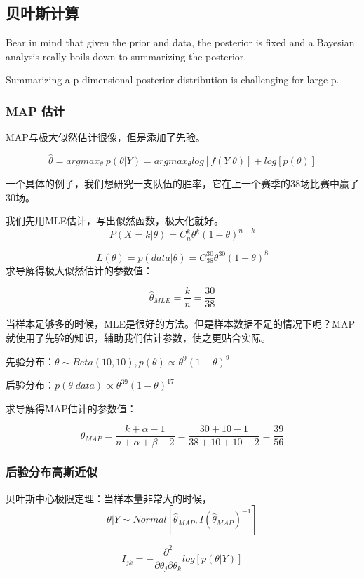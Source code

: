 \documentclass[
]{book}
\begin{document}
\subsection{贝叶斯计算}\label{ux8d1dux53f6ux65afux8ba1ux7b97-1}

Bear in mind that given the prior and data, the posterior is fixed and a Bayesian analysis really boils down to summarizing the posterior.

Summarizing a p-dimensional posterior distribution is challenging for large p.

\subsubsection{MAP 估计}\label{map-ux4f30ux8ba1}

MAP与极大似然估计很像，但是添加了先验。

\[
\hat{\theta}=argmax_{\theta}\ p(\theta|Y) = argmax_{\theta} log[f(Y|\theta)]+log[p(\theta)]
\]

一个具体的例子，我们想研究一支队伍的胜率，它在上一个赛季的38场比赛中赢了30场。

我们先用MLE估计，写出似然函数，极大化就好。 \[
P(X=k|\theta)=C_n^k\theta^k(1-\theta)^{n-k}
\]

\[
L(\theta)=p(data|\theta) = C_{38}^{30}\theta^{30}(1-\theta)^8
\] 求导解得极大似然估计的参数值：

\[
\hat{\theta}_{MLE}=\frac{k}{n}=\frac{30}{38}
\]

当样本足够多的时候，MLE是很好的方法。但是样本数据不足的情况下呢？MAP就使用了先验的知识，辅助我们估计参数，使之更贴合实际。

先验分布：\(\theta\sim Beta(10,10),p(\theta)\propto \theta^9(1-\theta)^9\)

后验分布：\(p(\theta|data)\propto \theta^{39}(1-\theta)^{17}\)

求导解得MAP估计的参数值：

\[
\hat{\theta}_{MAP}=\frac{k+\alpha-1}{n+\alpha+\beta-2}=\frac{30+10-1}{38+10+10-2}=\frac{39}{56}
\]

\subsubsection{后验分布高斯近似}\label{ux540eux9a8cux5206ux5e03ux9ad8ux65afux8fd1ux4f3c}

贝叶斯中心极限定理：当样本量非常大的时候， \[
\theta|Y\sim Normal[\hat{\theta}_{MAP},I(\hat{\theta}_{MAP})^{-1}]
\]

\[
I_{jk}=-\frac{\partial^2}{\partial\theta_j\partial\theta_k}log[p(\theta|Y)]
\]
\end{document}
